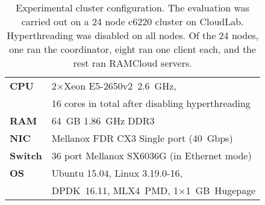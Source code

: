\begin{table}[t]
\caption{Experimental cluster configuration. The evaluation was
carried out on a 24 node c6220 cluster on CloudLab. Hyperthreading was
disabled on all nodes. Of the 24 nodes, one
ran the coordinator, eight ran one client each, and the rest ran
RAMCloud servers.
}
\vspace{21pt}
\centering
\small
\begin{tabular}{p{} p{}}
\toprule
\textbf{CPU} & 2$\times$Xeon E5-2650v2~2.6~GHz,\\
        & 16 cores in total after disabling hyperthreading
\\
\midrule
\textbf{RAM} & 64~GB 1.86~GHz DDR3
\\
\midrule
\textbf{NIC} & Mellanox FDR CX3 Single port (40~Gbps)
\\
\midrule
\textbf{Switch} & 36 port Mellanox SX6036G (in Ethernet mode)
\\
\midrule
\textbf{OS} & Ubuntu 15.04, Linux 3.19.0-16,\\
        & DPDK~16.11, MLX4~PMD, 1$\times$1~GB~Hugepage
\\
\bottomrule
\end{tabular}
\label{table:rexptconfig}
\end{table}
